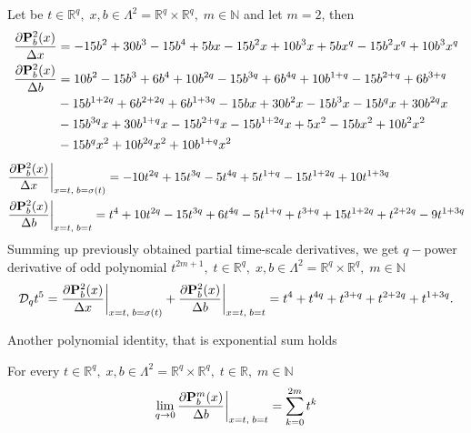 \begin{examp}
    \label{time_scale_nq_example_2}
    Let be $t\in {\mathbb{R}}^{q}, \; x,b\in\Lambda^2 = {\mathbb{R}}^{q} \times {\mathbb{R}}^{q}, \; m\in\mathbb{N}$ and let $m=2$, then
    \begin{align*}
        \frac{\partial {\mathbf{P}}\sp{2} \sb{b}(x)}{\Delta x}
        &= -15 b^2 + 30 b^3 - 15 b^4 + 5 b x - 15 b^2 x + 10 b^3 x + 5 b x^q - 15 b^2 x^q + 10 b^3 x^q \\
        \frac{\partial {\mathbf{P}}\sp{2} \sb{b}(x)}{\Delta b}
        &= 10 b^2 - 15 b^3 + 6 b^4 + 10 b^{2 q} - 15 b^{3 q} + 6 b^{4 q}
        + 10 b^{1 + q} - 15 b^{2 + q} + 6 b^{3 + q} \\
        &- 15 b^{1 + 2 q} + 6 b^{2 + 2 q} + 6 b^{1 + 3 q} - 15 b x + 30 b^2 x - 15 b^3 x
        - 15 b^q x + 30 b^{2 q} x \\
        &- 15 b^{3 q} x + 30 b^{1 + q} x - 15 b^{2 + q} x - 15 b^{1 + 2 q} x + 5 x^2 - 15 b x^2 + 10 b^2 x^2 \\
        &- 15 b^q x^2 + 10 b^{2 q} x^2 + 10 b^{1 + q} x^2
    \end{align*}
    \begin{align*}
        &\frac{\partial {\mathbf{P}}\sp{2} \sb{b}(x)}{\Delta x} \bigg |_{x = t, \; b = \sigma(t)}
        = -10 t^{2 q} + 15 t^{3q} - 5 t^{4q} + 5 t^{1+q} - 15 t^{1+2q} + 10 t^{1 + 3 q} \\
        &\frac{\partial {\mathbf{P}}\sp{2} \sb{b}(x)}{\Delta b} \bigg |_{x = t, \; b = t}
        = t^4 + 10 t^{2 q} - 15 t^{3 q} + 6 t^{4 q} - 5 t^{1 + q} + t^{3 + q}
        + 15 t^{1 + 2 q} + t^{2 + 2 q} - 9 t^{1 + 3 q}
    \end{align*}
    Summing up previously obtained partial time-scale derivatives, we get $q-$power derivative of odd polynomial
    $t^{2m+1}, \; t\in {\mathbb{R}}^{q}, \; x,b\in\Lambda^2 = {\mathbb{R}}^{q} \times {\mathbb{R}}^{q}, \; m\in\mathbb{N}$
    \[
        \mathcal{D}_q t^{5}
        = \frac{\partial {\mathbf{P}}\sp{2} \sb{b}(x)}{\Delta x} \bigg |_{x = t, \; b = \sigma(t)}
        + \frac{\partial {\mathbf{P}}\sp{2} \sb{b}(x)}{\Delta b} \bigg |_{x = t, \; b = t}
        = t^4 + t^{4 q} + t^{3 + q} + t^{2 + 2 q} + t^{1 + 3 q}.
    \]
\end{examp}
Another polynomial identity, that is exponential sum holds
\begin{cor}
    \label{time_scale_nq_corollary_1}
    For every $t\in {\mathbb{R}}^{q}, \; x,b\in\Lambda^2 = {\mathbb{R}}^{q} \times {\mathbb{R}}^{q}, \; t\in\mathbb{R}, \; m\in\mathbb{N}$
    \[
        \lim \limits_{q \to 0} \frac{\partial {\mathbf{P}}\sp{m} \sb{b}(x)}{\Delta b} \bigg |_{x = t, \; b = t}
        = \sum_{k=0}^{2m} t^k
    \]
\end{cor}